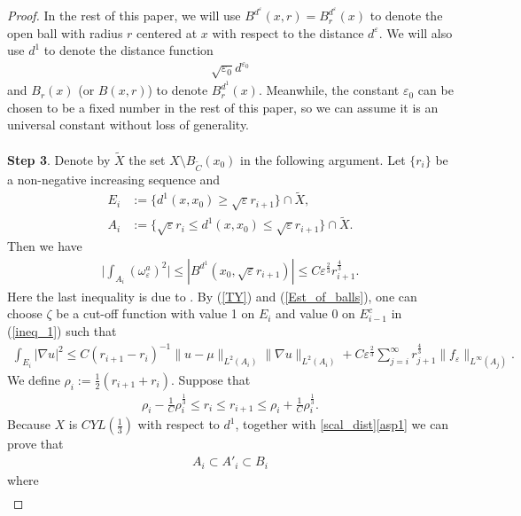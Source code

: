 \documentclass[11pt]{amsart}
\theoremstyle{plain}
\theoremstyle{definition}
\numberwithin{equation}{section}
\renewcommand{\leq}{\leqslant}
\renewcommand{\geq}{\geqslant}
\begin{document}
\begin{proof}
In the rest of this paper, we will use $B^{d^{\varepsilon}}(x,r)=B^{d^{\varepsilon}}_r(x)$ to denote the open ball with radius $r$ centered at $x$ with respect to the distance $d^{\varepsilon}$. We will also use $d^1$ to denote the distance function
\begin{align*}
\sqrt{\varepsilon_0}d^{\varepsilon_0}
\end{align*}
and $B_r(x)$ (or $B(x,r)$) to denote $B^{d^{1}}_r(x)$. Meanwhile, the constant $\varepsilon_0$ can be chosen to be a fixed number in the rest of this paper, so we can assume it is an universal constant without loss of generality.\\
\ \\
{\bf Step 3}. Denote by $\tilde{X}$ the set $X\setminus B_{\tilde{C}}(x_0)$ in the following argument. Let $\{r_i\}$ be a non-negative increasing sequence and
\begin{align}
E_i&:=\{d^1 (x,x_0)\geq\sqrt{\varepsilon}r_{i+1}\}\cap \tilde{X},\\
A_i&:=\{\sqrt{\varepsilon}r_{i}\leq d^1(x,x_0)\leq\sqrt{\varepsilon}r_{i+1}\}\cap\tilde{X}.
\end{align}  
Then we have
\begin{align}\label{Est_of_balls}
\Big|\int_{A_i}(\omega^a_{\varepsilon})^2\Big|\leq |B^{d^1}(x_0,\sqrt{\varepsilon} r_{i+1})|\leq C\varepsilon^{\frac{2}{3}} r_{i+1}^{\frac{4}{3}}.
\end{align} Here the last inequality is due to \cite[Theorem 1.5 (iii)]{Hein}.
By (\ref{TY}) and (\ref{Est_of_balls}), one can choose $\zeta$ be a cut-off function with value 1 on $E_{i}$ and value 0 on $E_{i-1}^c$ in  (\ref{ineq_1}) such that
\begin{align}\label{ineq_2}
\int_{E_i}|\nabla u|^2\leq C(r_{i+1}-r_i)^{-1}\|u-\mu\|_{L^2(A_i)}\|\nabla u\|_{L^2(A_i)}+C\varepsilon^{\frac{2}{3}}\sum_{j=i}^{\infty}r_{j+1}^{\frac{4}{3}}\|f_{\varepsilon}\|_{L^{\infty}(A_j)}.
\end{align}
We define $\rho_i:=\frac{1}{2}(r_{i+1}+r_i)$. Suppose that
\begin{align}\label{asp1}
\rho_i-\frac{1}{C}\rho_i^{\frac{1}{3}}\leq r_i\leq r_{i+1}\leq \rho_i+\frac{1}{C}\rho_i^{\frac{1}{3}}.
\end{align}
Because $X$ is $CYL(\frac{1}{3})$ with respect to $d^1$, together with \eqref{scal_dist}\eqref{asp1} we can prove that
\begin{align}\label{domain_incl}
A_i\subset A'_i\subset B_i
\end{align}
where
\begin{align}

\end{align}
\end{proof}
\end{document}
